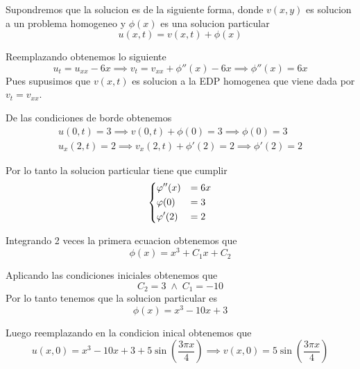 \documentclass[../main.tex]{subfiles}
\begin{document}
\begin{solution}
  Supondremos que la solucion es de la siguiente forma, donde $v(x, y)$ es solucion a un problema
  homogeneo y $\phi(x)$ es una solucion particular
  \begin{equation*}
  u(x, t) = v(x, t) + \phi(x)
  \end{equation*}

  Reemplazando obtenemos lo siguiente
  \begin{equation*}
    u_{t} = u_{xx} - 6x \implies v_{t} = v_{xx} + \phi''(x) - 6x \implies \phi''(x) = 6x
  \end{equation*}
  Pues supusimos que $v(x, t)$ es solucion a la EDP homogenea que viene dada por $v_{t} = v_{xx}$.

  De las condiciones de borde obtenemos
  \begin{gather*}
    u(0, t) = 3 \implies v(0, t) + \phi(0) = 3 \implies \phi(0) = 3\\
    u_{x}(2, t) = 2 \implies v_{x}(2, t) + \phi'(2) = 2 \implies \phi'(2) = 2
  \end{gather*}

  Por lo tanto la solucion particular tiene que cumplir
  \begin{equation*}
    \begin{dcases}
      \phi''(x) &= 6x\\
      \phi(0) &= 3\\
      \phi'(2) &= 2
    \end{dcases}
  \end{equation*}

  Integrando 2 veces la primera ecuacion obtenemos que
  \begin{equation*}
    \phi(x) = x^{3} + C_{1}x + C_{2}
  \end{equation*}

  Aplicando las condiciones iniciales obtenemos que
  \begin{equation*}
    C_{2} = 3 \; \land \; C_{1} = -10
  \end{equation*}
  Por lo tanto tenemos que la solucion particular es
  \begin{equation*}
    \phi(x) = x^{3} - 10x + 3
  \end{equation*}

  Luego reemplazando en la condicion inical obtenemos que
  \begin{equation*}
    u(x, 0) = x^{3} -10x + 3 + 5\sin(\frac{3\pi x}{4}) \implies v(x, 0) = 5 \sin(\frac{3 \pi x}{4})
  \end{equation*}


\end{solution}
\end{document}

